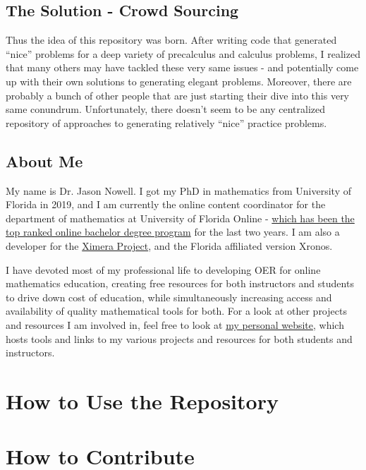 \documentclass{article}
\begin{document}
    \subsection{The Solution - Crowd Sourcing}
        Thus the idea of this repository was born. After writing code that generated ``nice'' problems for a deep variety of precalculus and calculus problems, I realized that many others may have tackled these very same issues - and potentially come up with their own solutions to generating elegant problems. Moreover, there are probably a bunch of other people that are just starting their dive into this very same conundrum. Unfortunately, there doesn't seem to be any centralized repository of approaches to generating relatively ``nice'' practice problems.
    
    
    \subsection{About Me}
        My name is Dr. Jason Nowell. I got my PhD in mathematics from University of Florida in 2019, and I am currently the online content coordinator for the department of mathematics at University of Florida Online - \href{https://ufonline.ufl.edu/news-and-updates/us-news-world-report-uf-online-no-1-ranked-online-bachelors-degrees-2023/}{which has been the top ranked online bachelor degree program} for the last two years. I am also a developer for the \href{https://ximera.osu.edu/}{Ximera Project}, and the Florida affiliated version Xronos. 
        
        I have devoted most of my professional life to developing OER for online mathematics education, creating free resources for both instructors and students to drive down cost of education, while simultaneously increasing access and availability of quality mathematical tools for both. For a look at other projects and resources I am involved in, feel free to look at \href{www.jasonnowell.com}{my personal website}, which hosts tools and links to my various projects and resources for both students and instructors.

    
\section{How to Use the Repository}
    
    
\section{How to Contribute}
    
    
    
\end{document}

